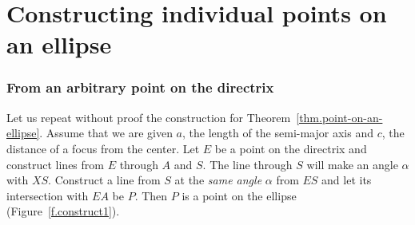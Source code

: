 
\section{Constructing individual points on an ellipse}\label{s.individual}

\subsubsection*{From an arbitrary point on the directrix}

Let us repeat without proof the construction for Theorem~\ref{thm.point-on-an-ellipse}. Assume that we are given $a$, the length of the semi-major axis and $c$, the distance of a focus from the center. Let $E$ be a point on the directrix and construct lines from $E$ through $A$ and $S$. The line through $S$ will make an angle $\alpha$ with $XS$. Construct a line from $S$ at the \emph{same angle} $\alpha$ from $ES$ and let its intersection with $EA$ be $P$. Then $P$ is a point on the ellipse (Figure~\ref{f.construct1}). 


